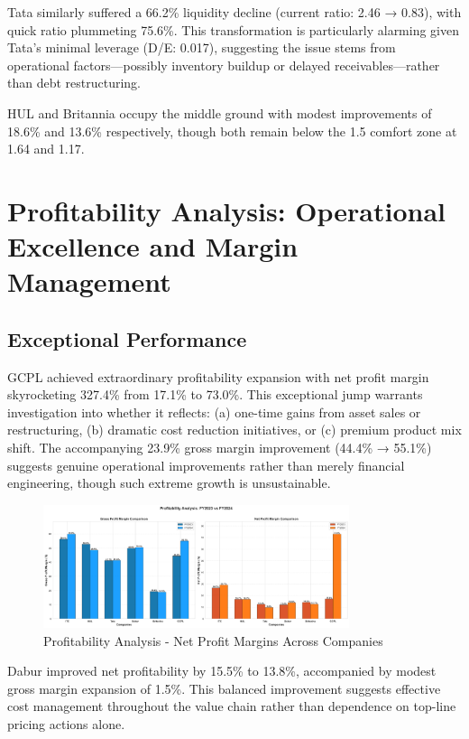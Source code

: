 \documentclass[12pt, a4paper]{report}
\begin{document}
Tata similarly suffered a 66.2\% liquidity decline (current ratio: 2.46 → 0.83), with quick ratio plummeting 75.6\%. This transformation is particularly alarming given Tata's minimal leverage (D/E: 0.017), suggesting the issue stems from operational factors—possibly inventory buildup or delayed receivables—rather than debt restructuring.

HUL and Britannia occupy the middle ground with modest improvements of 18.6\% and 13.6\% respectively, though both remain below the 1.5 comfort zone at 1.64 and 1.17.

\section{Profitability Analysis: Operational Excellence and Margin Management}

\subsection{Exceptional Performance}

GCPL achieved extraordinary profitability expansion with net profit margin skyrocketing 327.4\% from 17.1\% to 73.0\%. This exceptional jump warrants investigation into whether it reflects: (a) one-time gains from asset sales or restructuring, (b) dramatic cost reduction initiatives, or (c) premium product mix shift. The accompanying 23.9\% gross margin improvement (44.4\% → 55.1\%) suggests genuine operational improvements rather than merely financial engineering, though such extreme growth is unsustainable.

\begin{figure}[H]
    \centering
    \includegraphics[width=0.8\textwidth]{assets/imperative_analysis/profitability_analysis.png}
    \caption{Profitability Analysis - Net Profit Margins Across Companies}
\end{figure}

\vspace{0.3cm}

Dabur improved net profitability by 15.5\% to 13.8\%, accompanied by modest gross margin expansion of 1.5\%. This balanced improvement suggests effective cost management throughout the value chain rather than dependence on top-line pricing actions alone.
\end{document}
